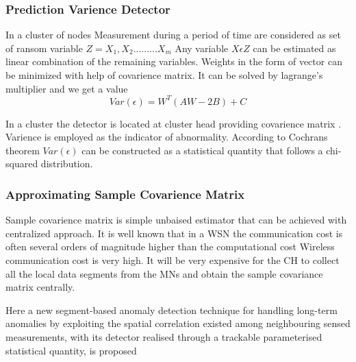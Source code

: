 \documentclass[10pt,a4paper,journal]{IEEEtran}
\begin{document}
\subsubsection{Prediction Varience Detector}
In a cluster of nodes Measurement during a period of time are
considered as set of ransom variable $Z = X_1, X_2 .........X_m$
Any variable $X\epsilon Z$ can be estimated as linear combination of the remaining variables. Weights in the form of vector can be minimized with help of covarience matrix.
It can be solved by lagrange's multiplier and we get a value\\

\begin{equation}
    Var (\epsilon) = W^T (AW -2B) + C
\end{equation}



In a cluster the detector is located at cluster head providing
covarience matrix \cite{12}. Varience is employed as the indicator of abnormality. According to Cochrans theorem $Var (\epsilon)$ can be constructed as a statistical quantity that follows a chi-squared distribution. 
\subsubsection{Approximating Sample Covarience Matrix}
Sample covarience matrix is simple unbaised estimator that can be
achieved with centralized approach. It is well known that in a WSN the communication cost is often several orders of magnitude higher than the computational cost Wireless communication cost is very high. It will be very expensive for the CH to collect all the local data segments from the MNs and obtain the sample covariance matrix centrally.


\par Here a new segment-based anomaly detection technique for handling long-term anomalies by exploiting the spatial correlation existed among neighbouring sensed measurements, with its detector realised through a trackable parameterised statistical quantity, is proposed
\end{document}
